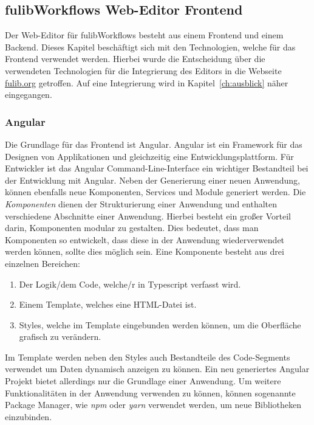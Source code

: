 \subsection{fulibWorkflows Web-Editor Frontend}\label{subsec:fulibworkflows-web-editor}
Der Web-Editor für fulibWorkflows besteht aus einem Frontend und einem Backend.
Dieses Kapitel beschäftigt sich mit den Technologien, welche für das Frontend verwendet werden.
Hierbei wurde die Entscheidung über die verwendeten Technologien für die Integrierung des Editors in die Webseite \url{fulib.org} getroffen.
Auf eine Integrierung wird in Kapitel~\ref{ch:ausblick} näher eingegangen.

\subsubsection{Angular}
Die Grundlage für das Frontend ist Angular.
Angular ist ein Framework für das Designen von Applikationen und gleichzeitig eine Entwicklungsplattform.\cite*{angular}
Für Entwickler ist das Angular Command-Line-Interface ein wichtiger Bestandteil bei der Entwicklung mit Angular.
Neben der Generierung einer neuen Anwendung, können ebenfalls neue Komponenten, Services und Module generiert werden.
Die \textit{Komponenten} dienen der Strukturierung einer Anwendung und enthalten verschiedene Abschnitte einer Anwendung.
Hierbei besteht ein großer Vorteil darin, Komponenten modular zu gestalten.
Dies bedeutet, dass man Komponenten so entwickelt, dass diese in der Anwendung wiederverwendet werden können, sollte dies möglich sein.
Eine Komponente besteht aus drei einzelnen Bereichen:

\begin{enumerate}
    \item Der Logik/dem Code, welche/r in Typescript verfasst wird.
    \item Einem Template, welches eine HTML-Datei ist.
    \item Styles, welche im Template eingebunden werden können, um die Oberfläche grafisch zu verändern.
\end{enumerate}

Im Template werden neben den Styles auch Bestandteile des Code-Segments verwendet um Daten dynamisch anzeigen zu können.
Ein neu generiertes Angular Projekt bietet allerdings nur die Grundlage einer Anwendung.
Um weitere Funktionalitäten in der Anwendung verwenden zu können, können sogenannte Package Manager, wie \textit{npm} oder \textit{yarn}
verwendet werden, um neue Bibliotheken einzubinden.

